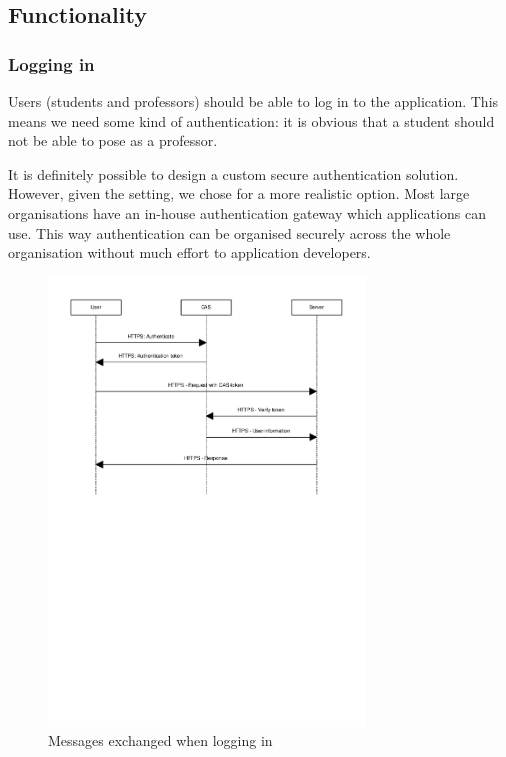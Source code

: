 \documentclass{article}
\begin{document}
\subsection{Functionality}

\subsubsection{Logging in}

Users (students and professors) should be able to log in to the application.
This means we need some kind of authentication: it is obvious that a student
should not be able to pose as a professor.

It is definitely possible to design a custom secure authentication solution.
However, given the setting, we chose for a more realistic option. Most large
organisations have an in-house authentication gateway which applications can
use. This way authentication can be organised securely across the whole
organisation without much effort to application developers.

\begin{figure}
\begin{center}
\includegraphics[width=0.75\textwidth]{images/login.pdf}
\caption{Messages exchanged when logging in}
\label{fig:login}
\end{center}
\end{figure}
\end{document}
